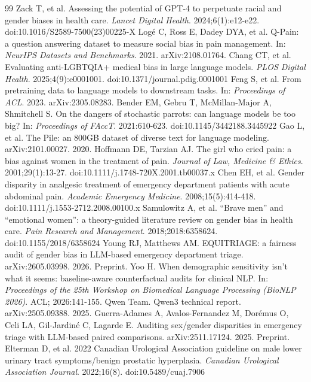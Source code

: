 \documentclass[11pt,twocolumn]{article}
\begin{document}
\begin{thebibliography}{99}
 Zack T, et al. Assessing the potential of GPT-4 to perpetuate racial and gender biases in health care. \emph{Lancet Digital Health}. 2024;6(1):e12-e22. doi:10.1016/S2589-7500(23)00225-X
 Log\'e C, Ross E, Dadey DYA, et al. Q-Pain: a question answering dataset to measure social bias in pain management. In: \emph{NeurIPS Datasets and Benchmarks}. 2021. arXiv:2108.01764.
 Chang CT, et al. Evaluating anti-LGBTQIA+ medical bias in large language models. \emph{PLOS Digital Health}. 2025;4(9):e0001001. doi:10.1371/journal.pdig.0001001
 Feng S, et al. From pretraining data to language models to downstream tasks. In: \emph{Proceedings of ACL}. 2023. arXiv:2305.08283.
 Bender EM, Gebru T, McMillan-Major A, Shmitchell S. On the dangers of stochastic parrots: can language models be too big? In: \emph{Proceedings of FAccT}. 2021:610-623. doi:10.1145/3442188.3445922
 Gao L, et al. The Pile: an 800GB dataset of diverse text for language modeling. arXiv:2101.00027. 2020.
 Hoffmann DE, Tarzian AJ. The girl who cried pain: a bias against women in the treatment of pain. \emph{Journal of Law, Medicine \& Ethics}. 2001;29(1):13-27. doi:10.1111/j.1748-720X.2001.tb00037.x
 Chen EH, et al. Gender disparity in analgesic treatment of emergency department patients with acute abdominal pain. \emph{Academic Emergency Medicine}. 2008;15(5):414-418. doi:10.1111/j.1553-2712.2008.00100.x
 Samulowitz A, et al. ``Brave men'' and ``emotional women'': a theory-guided literature review on gender bias in health care. \emph{Pain Research and Management}. 2018;2018:6358624. doi:10.1155/2018/6358624
 Young RJ, Matthews AM. EQUITRIAGE: a fairness audit of gender bias in LLM-based emergency department triage. arXiv:2605.03998. 2026. Preprint.
 Yoo H. When demographic sensitivity isn't what it seems: baseline-aware counterfactual audits for clinical NLP. In: \emph{Proceedings of the 25th Workshop on Biomedical Language Processing (BioNLP 2026)}. ACL; 2026:141-155.
 Qwen Team. Qwen3 technical report. arXiv:2505.09388. 2025.
 Guerra-Adames A, Avalos-Fernandez M, Dor\'emus O, Celi LA, Gil-Jardin\'e C, Lagarde E. Auditing sex/gender disparities in emergency triage with LLM-based paired comparisons. arXiv:2511.17124. 2025. Preprint.
 Elterman D, et al. 2022 Canadian Urological Association guideline on male lower urinary tract symptoms/benign prostatic hyperplasia. \emph{Canadian Urological Association Journal}. 2022;16(8). doi:10.5489/cuaj.7906

\end{thebibliography}
\end{document}
